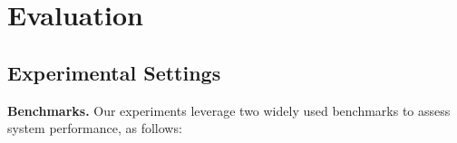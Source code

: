 \vspace*{-3mm}
\section{Evaluation}
\label{sec:evaluation}



\subsection{Experimental Settings}
\label{sec:experiment-settings}

\noindent\textbf{Benchmarks.} Our experiments leverage two widely used benchmarks to assess system performance, as follows:

